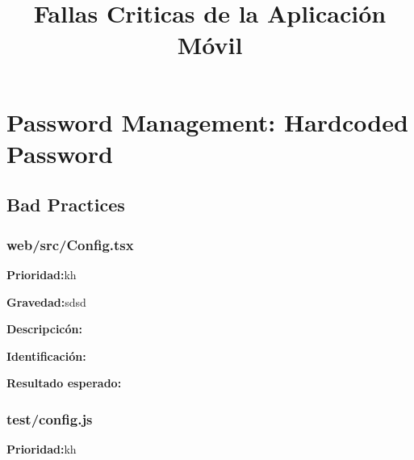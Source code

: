 \documentclass{article}
\title{Fallas Criticas de la Aplicación Móvil}
\date{ }
\begin{document}
\maketitle
\newpage
\tableofcontents
\newpage

\section{Password Management: Hardcoded Password}
    \subsection{Bad Practices}
        \subsubsection{web/src/Config.tsx}

            \begingroup
            \noindent
            \leftskip 35pt 
            \rightskip 0pt 
            \vspace{10pt}
            \textbf{Prioridad:}kh

            \endgroup

            \begingroup
            \noindent
            \leftskip 35pt 
            \rightskip 0pt 
            \vspace{10pt}
            \textbf{Gravedad:}sdsd

            \endgroup
                
            \begingroup
            \noindent
            \leftskip 35pt 
            \rightskip 0pt 
            \vspace{10pt}
            \textbf{Descripcicón:}
           
            \endgroup

            \begingroup
            \noindent
            \leftskip 35pt 
            \rightskip 0pt 
            \vspace{10pt}
            \textbf{Identificación:}
            
            \endgroup

            \begingroup
            \noindent
            \leftskip 35pt 
            \rightskip 0pt 
            \vspace{10pt}
            \textbf{Resultado esperado:}
          
            \endgroup
    
        \subsubsection{test/config.js}
            \begingroup
            \noindent
            \leftskip 35pt 
            \rightskip 0pt 
            \vspace{10pt}
            \textbf{Prioridad:}kh
\end{document}
